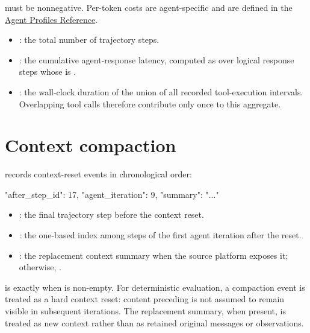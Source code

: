 \documentclass[11pt]{article}
\begin{document}
 must be nonnegative.
Per-token costs are agent-specific and are defined in the \hyperref[docstart:agent_profiles]{Agent Profiles Reference}.

\begin{itemize}
  \item {}: the total number of trajectory steps.
  \item {}: the cumulative agent-response latency, computed as  over logical response steps whose  is .
  \item {}: the wall-clock duration of the union of all recorded tool-execution intervals.
  Overlapping tool calls therefore contribute only once to this aggregate.
\end{itemize}

\section*{Context compaction}

 records context-reset events in chronological order:
\begin{DocCode}
{
  "after_step_id": 17,
  "agent_iteration": 9,
  "summary": "..."
}
\end{DocCode}

\begin{itemize}
  \item {}: the final trajectory step before the context reset.
  \item {}: the one-based index among  steps of the first agent iteration after the reset.
  \item {}: the replacement context summary when the source platform exposes it; otherwise, .
\end{itemize}

 is  exactly when  is non-empty.
For deterministic evaluation, a compaction event is treated as a hard context reset: content preceding  is not assumed to remain visible in subsequent iterations.
The replacement summary, when present, is treated as new context rather than as retained original messages or observations.

\section*{\texorpdfstring{}{steps}}
\end{document}
